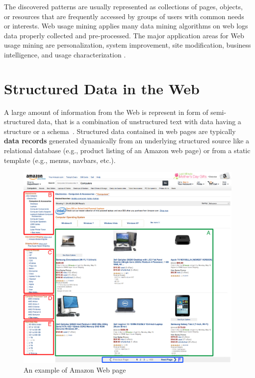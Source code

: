 \begin{itemize}
 The discovered patterns are usually represented as collections of pages, objects, or resources that are frequently accessed by groups of users with common needs or interests. Web usage mining applies many data mining algorithms on web logs data properly collected and pre-processed. The major application areas for Web usage mining are personalization, system improvement, site modification, business intelligence, and usage characterization \cite{Srivastava:2000}.   %
\end{itemize} 

\section{Structured Data in the Web}
\label{sec:Structured Data in the Web}
A large amount of information from the Web is represent in form of semi-structured data, that is a combination of unstructured text with data having a structure or a schema~\cite{Arasu:2002}. Structured data contained in web pages are typically \textbf{data records} generated dynamically from an underlying structured source like a relational database (e.g., product listing of an Amazon web page) or from a  static template (e.g., menus, navbars, etc.).

\begin{figure}[h]
\centering
\includegraphics[scale=0.40]{imgs/chap_2/Amazon.png}
\caption{An example of Amazon Web page}
\label{fig:amazon1}
\end{figure}

